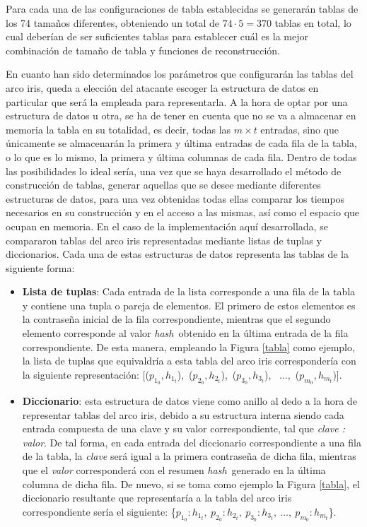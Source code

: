 \documentclass[12pt,spanish,listoffigures,listoftables]{tfgetsinf}
\newcommand{\hash}{\textit{hash}}
\begin{document}
Para cada una de las configuraciones de tabla establecidas se generarán tablas de los 74 tamaños diferentes, obteniendo un total de $74 \cdot 5 = 370$ tablas en total, lo cual deberían de ser suficientes tablas para establecer cuál es la mejor combinación de tamaño de tabla y funciones de reconstrucción.

En cuanto han sido determinados los parámetros que configurarán las tablas del arco iris, queda a elección del atacante escoger la estructura de datos en particular que será la empleada para representarla. A la hora de optar por una estructura de datos u otra, se ha de tener en cuenta que no se va a almacenar en memoria la tabla en su totalidad, es decir, todas las $m \times t$ entradas, sino que únicamente se almacenarán la primera y última entradas de cada fila de la tabla, o lo que es lo mismo, la primera y última columnas de cada fila. Dentro de todas las posibilidades lo ideal sería, una vez que se haya desarrollado el método de construcción de tablas, generar aquellas que se desee mediante diferentes estructuras de datos, para una vez obtenidas todas ellas comparar los tiempos necesarios en su construcción y en el acceso a las mismas, así como el espacio que ocupan en memoria. En el caso de la implementación aquí desarrollada, se compararon tablas del arco iris representadas mediante listas de tuplas y diccionarios. Cada una de estas estructuras de datos representa las tablas de la siguiente forma:

\begin{itemize}

    \item \textbf{Lista de tuplas}: Cada entrada de la lista corresponde a una fila de la tabla y contiene una tupla o pareja de elementos. El primero de estos elementos es la contraseña inicial de la fila correspondiente, mientras que el segundo elemento corresponde al valor \hash~obtenido en la última entrada de la fila correspondiente. De esta manera, empleando la Figura \ref{tabla} como ejemplo, la lista de tuplas que equivaldría a esta tabla del arco iris correspondería con la siguiente representación: [($p_{1_0}, h_{1_t}$),~($p_{2_0}, h_{2_t}$),~($p_{3_0}, h_{3_t}$), ~$\dots$,~($p_{m_0}, h_{m_t}$)].
    
    \item \textbf{Diccionario}: esta estructura de datos viene como anillo al dedo a la hora de representar tablas del arco iris, debido a su estructura interna siendo cada entrada compuesta de una clave y su valor correspondiente, tal que \textit{clave : valor}. De tal forma, en cada entrada del diccionario correspondiente a una fila de la tabla, la \textit{clave} será igual a la primera contraseña de dicha fila, mientras que el \textit{valor} corresponderá con el resumen \hash~generado en la última columna de dicha fila. De nuevo, si se toma como ejemplo la Figura \ref{tabla}, el diccionario resultante que representaría a la tabla del arco iris correspondiente sería el siguiente: \{$p_{1_0} : h_{1_t},~p_{2_0} : h_{2_t},~p_{3_0} : h_{3_t}, ~\dots,~p_{m_0} : h_{m_t}$\}.
    
\end{itemize}
\end{document}
